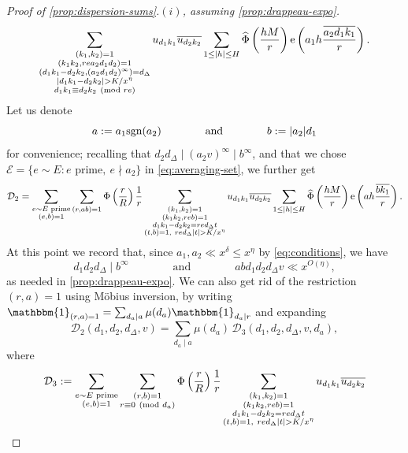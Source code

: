 \documentclass[reqno,11pt]{amsart}
\theoremstyle{definition}
\theoremstyle{remark}
\numberwithin{equation}{section}
\newcommand{\mE}{\mathcal{E}}
\newcommand{\mD}{\mathcal{D}}
\newcommand{\e}{\textnormal{e}}
\newcommand{\one}{\mathbbm{1}}
\newcommand{\sgn}{\textnormal{sgn}}
\renewcommand{\bar}{\overline}
\renewcommand{\hat}{\widehat}
\renewcommand{\pmod}[1]{\ (\textnormal{mod } #1)}
\begin{document}
\begin{proof}[Proof of \cref{prop:dispersion-sums}.$(i)$, assuming \cref{prop:drappeau-expo}]
\[\begin{aligned}
    \sum_{\substack{(k_1, k_2) = 1 \\ (k_1 k_2, re a_2 d_1 d_2) = 1 \\ (d_1 k_1 - d_2 k_2, (a_2 d_1 d_2)^\infty) = d_\Delta \\ |d_1 k_1 - d_2 k_2| > K/x^\eta \\ d_1k_1 \equiv d_2k_2 \pmod{re}}} u_{d_1k_1} \bar{u_{d_2k_2}} 
    \sum_{1 \le |h| \le H} \hat{\Phi}\left(\frac{hM}{r}\right) \e\left(a_1 h \frac{\bar{a_2d_1k_1}}{r} \right).
\end{aligned}
\]
Let us denote
\[
    a := a_1 \sgn(a_2)
    \qquad\qquad \text{and} \qquad\qquad 
    b := |a_2| d_1
\] 
for convenience; recalling that $d_2 d_\Delta \mid (a_2 v)^\infty \mid b^\infty$, and that we chose $\mE = \{e \sim E : e \text{ prime},\ e \nmid a_2\}$ in \cref{eq:averaging-set}, we further get
\[
    \mD_2 = \sum_{\substack{e \sim E \text{ prime} \\ (e, b) = 1}} \sum_{(r, ab) = 1} \Phi\left(\frac{r}{R}\right) \frac{1}{r}
    \sum_{\substack{(k_1, k_2) = 1 \\ (k_1 k_2, re b) = 1 \\ d_1k_1 - d_2k_2 = red_\Delta t \\ (t, b) = 1,\  red_\Delta |t| > K/x^\eta}} u_{d_1k_1} \bar{u_{d_2k_2}} 
    \sum_{1 \le |h| \le H} \hat{\Phi}\left(\frac{hM}{r}\right) \e\left(a h \frac{\bar{bk_1}}{r} \right).
\]
At this point we record that, since $a_1, a_2 \ll x^{\delta} \le x^\eta$ by \cref{eq:conditions}, we have
\[
    d_1 d_2 d_\Delta \mid b^\infty 
    \qquad\qquad 
    \text{and} 
    \qquad\qquad 
    a b d_1 d_2 d_\Delta v \ll x^{O(\eta)},
\]
as needed in \cref{prop:drappeau-expo}. We can also get rid of the restriction $(r, a) = 1$ using M\"obius inversion, by writing $\one_{(r, a) = 1} = \sum_{d_a \mid a} \mu(d_a) \one_{d_a \mid r}$ and expanding
\begin{equation} \label{eq:D23}
    \mD_2(d_1, d_2, d_\Delta, v) = \sum_{d_a \mid a} \mu(d_a)\, \mD_3(d_1, d_2, d_\Delta, v, d_a),
\end{equation}
where
\[
    \mD_3 := \sum_{\substack{e \sim E \text{ prime} \\ (e, b) = 1}} \sum_{\substack{(r, b) = 1 \\ r \equiv 0 \pmod{d_a}}} \Phi\left(\frac{r}{R}\right) \frac{1}{r}
    \sum_{\substack{(k_1, k_2) = 1 \\ (k_1 k_2, re b) = 1 \\ d_1k_1 - d_2k_2 = red_\Delta t \\ (t, b) = 1,\  red_\Delta |t| > K/x^\eta}} u_{d_1k_1} \bar{u_{d_2k_2}} 
\]
\end{proof}
\end{document}

